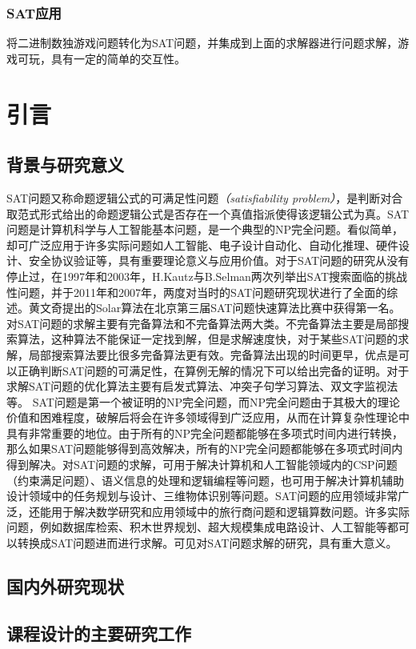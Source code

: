 \documentclass{ctexrep}
\begin{document}
\subsection{SAT应用}
将二进制数独游戏问题转化为SAT问题，并集成到上面的求解器进行问题求解，游戏可玩，具有一定的简单的交互性。

\chapter{引言}
\section{背景与研究意义}
SAT问题又称命题逻辑公式的可满足性问题\textit{（satisfiability problem）}，是判断对合取范式形式给出的命题逻辑公式是否存在一个真值指派使得该逻辑公式为真。SAT问题是计算机科学与人工智能基本问题，是一个典型的NP完全问题。看似简单，却可广泛应用于许多实际问题如人工智能、电子设计自动化、自动化推理、硬件设计、安全协议验证等，具有重要理论意义与应用价值。对于SAT问题的研究从没有停止过，在1997年和2003年，H.Kautz与B.Selman两次列举出SAT搜索面临的挑战性问题，并于2011年和2007年，两度对当时的SAT问题研究现状进行了全面的综述。黄文奇提出的Solar算法在北京第三届SAT问题快速算法比赛中获得第一名。对SAT问题的求解主要有完备算法和不完备算法两大类。不完备算法主要是局部搜索算法，这种算法不能保证一定找到解，但是求解速度快，对于某些SAT问题的求解，局部搜索算法要比很多完备算法更有效。完备算法出现的时间更早，优点是可以正确判断SAT问题的可满足性，在算例无解的情况下可以给出完备的证明。对于求解SAT问题的优化算法主要有启发式算法、冲突子句学习算法、双文字监视法等。
SAT问题是第一个被证明的NP完全问题，而NP完全问题由于其极大的理论价值和困难程度，破解后将会在许多领域得到广泛应用，从而在计算复杂性理论中具有非常重要的地位。由于所有的NP完全问题都能够在多项式时间内进行转换，那么如果SAT问题能够得到高效解决，所有的NP完全问题都能够在多项式时间内得到解决。对SAT问题的求解，可用于解决计算机和人工智能领域内的CSP问题（约束满足问题）、语义信息的处理和逻辑编程等问题，也可用于解决计算机辅助设计领域中的任务规划与设计、三维物体识别等问题。SAT问题的应用领域非常广泛，还能用于解决数学研究和应用领域中的旅行商问题和逻辑算数问题。许多实际问题，例如数据库检索、积木世界规划、超大规模集成电路设计、人工智能等都可以转换成SAT问题进而进行求解。可见对SAT问题求解的研究，具有重大意义。
\section{国内外研究现状}
\section{课程设计的主要研究工作}
\end{document}
